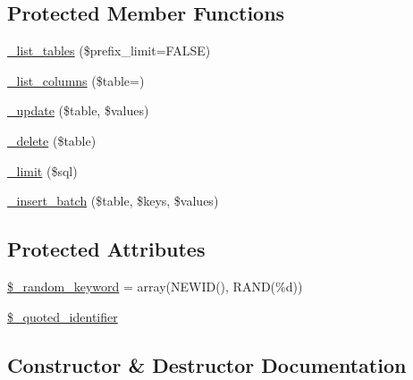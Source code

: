 \subsection*{Protected Member Functions}
\begin{DoxyCompactItemize}
\item 
\mbox{\hyperlink{class_c_i___d_b__pdo__dblib__driver_a435c0f3ce54fe7daa178baa8532ebd54}{\+\_\+list\+\_\+tables}} (\$prefix\+\_\+limit=F\+A\+L\+SE)
\item 
\mbox{\hyperlink{class_c_i___d_b__pdo__dblib__driver_a7ccb7f9c301fe7f0a9db701254142b63}{\+\_\+list\+\_\+columns}} (\$table=\textquotesingle{}\textquotesingle{})
\item 
\mbox{\hyperlink{class_c_i___d_b__pdo__dblib__driver_a2540b03a93fa73ae74c10d0e16fc073e}{\+\_\+update}} (\$table, \$values)
\item 
\mbox{\hyperlink{class_c_i___d_b__pdo__dblib__driver_a133ea8446ded52589bd22cc9163d0896}{\+\_\+delete}} (\$table)
\item 
\mbox{\hyperlink{class_c_i___d_b__pdo__dblib__driver_a3a02ea06541b8ecc25a33a61651562c8}{\+\_\+limit}} (\$sql)
\item 
\mbox{\hyperlink{class_c_i___d_b__pdo__dblib__driver_a1978e1358c812587a46e242630365099}{\+\_\+insert\+\_\+batch}} (\$table, \$keys, \$values)
\end{DoxyCompactItemize}
\subsection*{Protected Attributes}
\begin{DoxyCompactItemize}
\item 
\mbox{\hyperlink{class_c_i___d_b__pdo__dblib__driver_a10213aa6e05f6d924d3277bb1d2fea00}{\$\+\_\+random\+\_\+keyword}} = array(\textquotesingle{}N\+E\+W\+ID()\textquotesingle{}, \textquotesingle{}R\+A\+ND(\%d)\textquotesingle{})
\item 
\mbox{\hyperlink{class_c_i___d_b__pdo__dblib__driver_a1dae2f0e9ad7299438a9976d6cdbf2ad}{\$\+\_\+quoted\+\_\+identifier}}
\end{DoxyCompactItemize}


\subsection{Constructor \& Destructor Documentation}
\mbox{\label{class_c_i___d_b__pdo__dblib__driver_a9162320adff1a1a4afd7f2372f753a3e}} 
